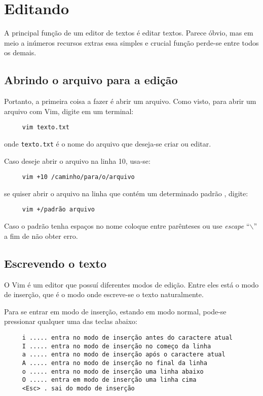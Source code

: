 
\chapter{Editando}
\label{Editando}
A principal função de um editor de textos é editar textos. 
Parece óbvio, mas em meio a inúmeros recursos extras essa simples e crucial
função perde-se entre todos os demais.

\section{Abrindo o arquivo para a edição}
Portanto, a primeira coisa a fazer é abrir um arquivo.
Como visto, para abrir um arquivo com Vim, digite em um terminal:
%
\begin{verbatim}
     vim texto.txt
\end{verbatim}
onde {\tt texto.txt} é o nome do arquivo que deseja-se criar ou editar.

Caso deseje abrir o arquivo na linha 10, usa-se:
\begin{verbatim}
     vim +10 /caminho/para/o/arquivo
\end{verbatim}
se quiser abrir o arquivo na linha que contém um determinado padrão
, digite:
\begin{verbatim}
     vim +/padrão arquivo
\end{verbatim}

{\Large {}} Caso o padrão tenha espaços no nome coloque entre parênteses ou
use {\em escape} ``$\backslash$'' a fim de não obter erro.

\section{Escrevendo o texto}
O Vim é um editor que possuí diferentes modos de edição. Entre eles está o modo
de inserção, que é o modo onde escreve-se o texto naturalmente.

Para se entrar em modo de inserção, estando em modo normal, pode-se pressionar 
qualquer uma das teclas abaixo:
\begin{verbatim}
     i ..... entra no modo de inserção antes do caractere atual
     I ..... entra no modo de inserção no começo da linha
     a ..... entra no modo de inserção após o caractere atual
     A ..... entra no modo de inserção no final da linha
     o ..... entra no modo de inserção uma linha abaixo
     O ..... entra em modo de inserção uma linha cima
     <Esc> . sai do modo de inserção
\end{verbatim}

